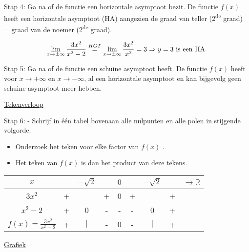 \begin{voorbeeld}
Stap 4: Ga na of de functie een horizontale asymptoot bezit. De functie
$f(x)$ heeft een horizontale asymptoot (HA) aangezien de graad van
teller (2\textsuperscript{de} graad) = graad van de noemer (2\textsuperscript{de}
graad).

\begin{equation*}
\lim_{x\to\pm\infty}\frac{3x^{2}}{x^{2}-2}\overset{HGT}{=} \lim_{x\to\pm\infty}\frac{3x^{2}}{x^{2}}=3 \\
\Rightarrow y=3\text{ is een HA}.
\end{equation*}

Stap 5: Ga na of de functie een schuine asymptoot heeft. De functie
$f(x)$ heeft voor $x\rightarrow+\infty$ en $x\rightarrow-\infty$,
al een horizontale asymptoot en kan bijgevolg geen schuine asymptoot
meer hebben.

\underline{Tekenverloop}

Stap 6: - Schrijf in \'e\'en tabel bovenaan alle nulpunten en alle polen
in stijgende volgorde. 

\begin{itemize}
\item Onderzoek het teken voor elke factor van $f(x)$ . 
\item Het teken van $f(x)$ is dan het product van deze tekens.
\end{itemize}

\begin{center}
	\begin{tabular}{c||cccccccc} 
$x$ &  & $-\sqrt{2}$ &  & $0$ &  & $-\sqrt{2}$ &  & ${\displaystyle \longrightarrow\mathbb{R}}$\\
\hline 
${\displaystyle 3x^{2}}$ & + &  & + & 0 & + &  & + & \\
\hline 
${\displaystyle x^{2}-2}$ & + & 0 & - & - & - & 0 & + & \\
\hline 
${\displaystyle f(x)=\frac{3x^{2}}{x^{2}-2}}$ & + & $\mid$ & - & 0 & - & $\mid$ & + & \\
\end{tabular}
\end{center}

\underline{Grafiek}




\end{voorbeeld}


